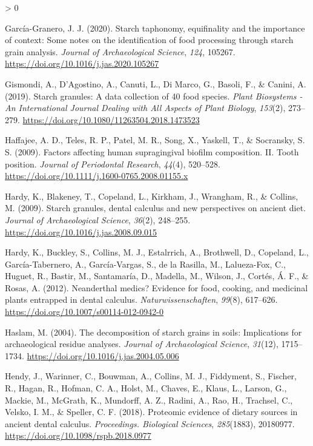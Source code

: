 \documentclass[
]{article}
\newlength{\cslhangindent}
\newenvironment{CSLReferences}[2] %
 {%
  \setlength{\parindent}{0pt}
  \ifodd #1 \everypar{\setlength{\hangindent}{\cslhangindent}}\ignorespaces\fi
  \ifnum #2 > 0
  \setlength{\parskip}{#2\baselineskip}
  \fi
 }%
 {}
\begin{document}
\begin{CSLReferences}{1}{0}
\leavevmode\hypertarget{ref-graneroStarchTaphonomy2020}{}%
García-Granero, J. J. (2020). Starch taphonomy, equifinality and the importance of context: Some notes on the identification of food processing through starch grain analysis. \emph{Journal of Archaeological Science}, \emph{124}, 105267. \url{https://doi.org/10.1016/j.jas.2020.105267}

\leavevmode\hypertarget{ref-gismondiStarchGranulesData2019}{}%
Gismondi, A., D'Agostino, A., Canuti, L., Di Marco, G., Basoli, F., \& Canini, A. (2019). Starch granules: A data collection of 40 food species. \emph{Plant Biosystems - An International Journal Dealing with All Aspects of Plant Biology}, \emph{153}(2), 273--279. \url{https://doi.org/10.1080/11263504.2018.1473523}

\leavevmode\hypertarget{ref-haffajeeBiofilmPosition2009}{}%
Haffajee, A. D., Teles, R. P., Patel, M. R., Song, X., Yaskell, T., \& Socransky, S. S. (2009). Factors affecting human supragingival biofilm composition. {II}. {Tooth} position. \emph{Journal of Periodontal Research}, \emph{44}(4), 520--528. \url{https://doi.org/10.1111/j.1600-0765.2008.01155.x}

\leavevmode\hypertarget{ref-hardyStarchGranulesDental2009}{}%
Hardy, K., Blakeney, T., Copeland, L., Kirkham, J., Wrangham, R., \& Collins, M. (2009). Starch granules, dental calculus and new perspectives on ancient diet. \emph{Journal of Archaeological Science}, \emph{36}(2), 248--255. \url{https://doi.org/10.1016/j.jas.2008.09.015}

\leavevmode\hypertarget{ref-hardyNeanderthalMedics2012}{}%
Hardy, K., Buckley, S., Collins, M. J., Estalrrich, A., Brothwell, D., Copeland, L., García-Tabernero, A., García-Vargas, S., de la Rasilla, M., Lalueza-Fox, C., Huguet, R., Bastir, M., Santamaría, D., Madella, M., Wilson, J., Cortés, Á. F., \& Rosas, A. (2012). Neanderthal medics? Evidence for food, cooking, and medicinal plants entrapped in dental calculus. \emph{Naturwissenschaften}, \emph{99}(8), 617--626. \url{https://doi.org/10.1007/s00114-012-0942-0}

\leavevmode\hypertarget{ref-haslamDecompositionStarch2004}{}%
Haslam, M. (2004). The decomposition of starch grains in soils: Implications for archaeological residue analyses. \emph{Journal of Archaeological Science}, \emph{31}(12), 1715--1734. \url{https://doi.org/10.1016/j.jas.2004.05.006}

\leavevmode\hypertarget{ref-hendyProteomicCalculus2018}{}%
Hendy, J., Warinner, C., Bouwman, A., Collins, M. J., Fiddyment, S., Fischer, R., Hagan, R., Hofman, C. A., Holst, M., Chaves, E., Klaus, L., Larson, G., Mackie, M., McGrath, K., Mundorff, A. Z., Radini, A., Rao, H., Trachsel, C., Velsko, I. M., \& Speller, C. F. (2018). Proteomic evidence of dietary sources in ancient dental calculus. \emph{Proceedings. Biological Sciences}, \emph{285}(1883), 20180977. \url{https://doi.org/10.1098/rspb.2018.0977}


\end{CSLReferences}
\end{document}
